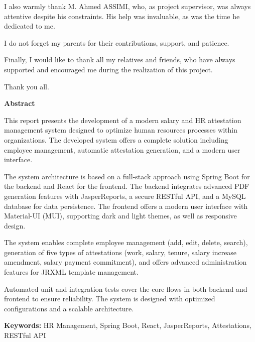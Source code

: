 \documentclass[a4paper,12pt]{report}
\begin{document}
\begin{doublespace}
{I also warmly thank M. Ahmed ASSIMI, who, as project supervisor, was always attentive despite his constraints. His help was invaluable, as was the time he dedicated to me.

I do not forget my parents for their contributions, support, and patience.

Finally, I would like to thank all my relatives and friends, who have always supported and encouraged me during the realization of this project.

Thank you all.
}

\end{doublespace}

\newpage
{}
{}

\begin{center}
\vspace{9cm}
    \textbf{\huge{Abstract}}
\end{center}

\begin{doublespace}
\vspace{1cm}
\large{
This report presents the development of a modern salary and HR attestation management system designed to optimize human resources processes within organizations. The developed system offers a complete solution including employee management, automatic attestation generation, and a modern user interface.

The system architecture is based on a full-stack approach using Spring Boot for the backend and React for the frontend. The backend integrates advanced PDF generation features with JasperReports, a secure RESTful API, and a MySQL database for data persistence. The frontend offers a modern user interface with Material-UI (MUI), supporting dark and light themes, as well as responsive design.

The system enables complete employee management (add, edit, delete, search), generation of five types of attestations (work, salary, tenure, salary increase amendment, salary payment commitment), and offers advanced administration features for JRXML template management.

Automated unit and integration tests cover the core flows in both backend and frontend to ensure reliability. The system is designed with optimized configurations and a scalable architecture.

\textbf{Keywords:} HR Management, Spring Boot, React, JasperReports, Attestations, RESTful API
}
\end{doublespace}
\end{document}
